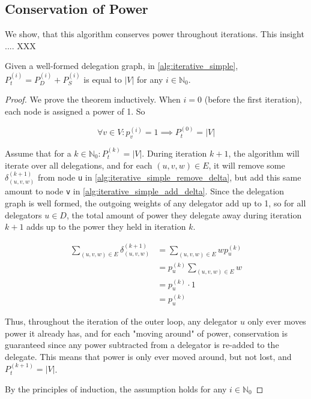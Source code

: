 \subsection{Conservation of Power}

We show, that this algorithm conserves power throughout iterations. This insight .... XXX 

\begin{theorem}
\label{theo:iterative_cons_of_power}
Given a well-formed delegation graph, in \cref{alg:iterative_simple}, $P_t^{(i)} = P_D^{(i)} + P_S^{(i)}$ is equal to $|V|$ for any $i \in \mathbb{N}_0$.
\end{theorem}
\begin{proof}

We prove the theorem inductively. When $i = 0$ (before the first iteration), each node is assigned a power of 1. So 

\[
\forall v \in V: p_v^{(i)} = 1 \implies P_t^{(0)} = |V|
\]

Assume that for a $k \in \mathbb{N}_0: P_t^{(k)} = |V|$. During iteration $k+1$, the algorithm will iterate over all delegations, and for each $(u, v, w) \in E$, it will remove some $\delta_{(u, v, w)}^{(k+1)}$ from node \texttt{u} in \cref{alg:iterative_simple_remove_delta}, but add this same amount to node \texttt{v} in \cref{alg:iterative_simple_add_delta}. Since the delegation graph is well formed, the outgoing weights of any delegator add up to 1, so for all delegators $u \in D$, the total amount of power they delegate away during iteration $k+1$ adds up to the power they held in iteration $k$.

\begin{align*}
\sum_{(u, v, w) \in E} \delta_{(u, v, w)}^{(k+1)} &=  \sum_{(u, v, w) \in E} wp_u^{(k)} \\
&= p_u^{(k)}  \sum_{(u, v, w) \in E} w \\
&= p_u^{(k)} \cdot 1 \\
&= p_u^{(k)}
\end{align*}

Thus, throughout the iteration of the outer loop, any delegator $u$ only ever moves power it already has, and for each "moving around" of power, conservation is guaranteed since any power subtracted from a delegator is re-added to the delegate. This means that power is only ever moved around, but not lost, and $P_t^{(k+1)} = |V|$. 

By the principles of induction, the assumption holds for any $i \in \mathbb{N}_0$
\end{proof}


